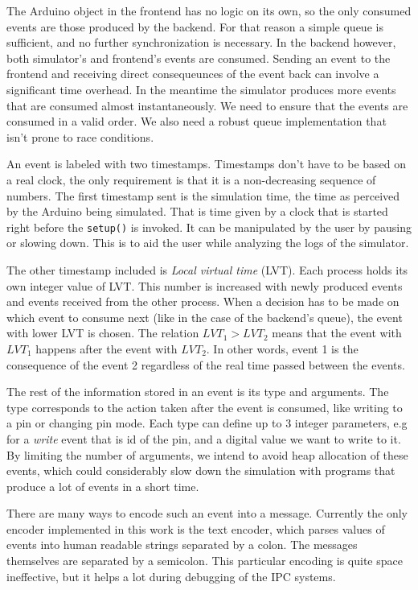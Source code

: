 The Arduino object in the frontend has no logic on its own, so the only consumed events are those produced by the backend. For that reason a simple queue is sufficient, and no further synchronization is necessary. In the backend however, both simulator's and frontend's events are consumed. Sending an event to the frontend and receiving direct consequeunces of the event back can involve a significant time overhead. In the meantime the simulator produces more events that are consumed almost instantaneously. We need to ensure that the events are consumed in a valid order. We also need a robust queue implementation that isn't prone to race conditions.

An event is labeled with two timestamps. Timestamps don't have to be based on a real clock, the only requirement is that it is a non-decreasing sequence of numbers. The first timestamp sent is the simulation time, the time as perceived by the Arduino being simulated. That is time given by a clock that is started right before the \texttt{setup()} is invoked. It can be manipulated by the user by pausing or slowing down. This is to aid the user while analyzing the logs of the simulator.

The other timestamp included is \textit{Local virtual time} (LVT)\footnotemark. Each process holds its own integer value of LVT. This number is increased with newly produced events and events received from the other process. When a decision has to be made on which event to consume next (like in the case of the backend's queue), the event with lower LVT is chosen. The relation $LVT_{1} > LVT_{2}$ means that the event with $LVT_{1}$ happens after the event with $LVT_{2}$. In other words, event 1 is the consequence of the event 2 regardless of the real time passed between the events.

The rest of the information stored in an event is its type and arguments. The type corresponds to the action taken after the event is consumed, like writing to a pin or changing pin mode. Each type can define up to 3 integer parameters, e.g for a \textit{write} event that is id of the pin, and a digital value we want to write to it. By limiting the number of arguments, we intend to avoid heap allocation of these events, which could considerably slow down the simulation with programs that produce a lot of events in a short time.

There are many ways to encode such an event into a message. Currently the only encoder implemented in this work is the text encoder, which parses values of events into human readable strings separated by a colon. The messages themselves are separated by a semicolon. This particular encoding is quite space ineffective, but it helps a lot during debugging of the IPC systems.

